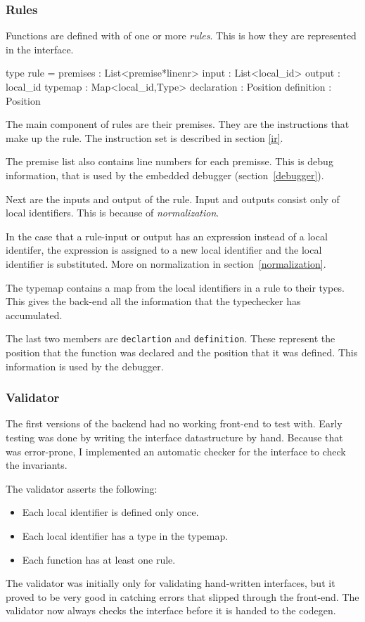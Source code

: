 \subsubsection{Rules}

Functions are defined with of one or more \textit{rules}.
This is how they are represented in the interface.

\begin{code}
type rule = {
  premises    : List<premise*linenr>
  input       : List<local_id>
  output      : local_id
  typemap     : Map<local_id,Type>
  declaration : Position
  definition  : Position
}
\end{code}

The main component of rules are their premises.
They are the instructions that make up the rule.
The instruction set is described in section \ref{ir}.

The premise list also contains line numbers for each premisse.
This is debug information, that is used by the embedded debugger (section~\ref{debugger}).

Next are the inputs and output of the rule.
Input and outputs consist only of local identifiers.
This is because of \textit{normalization}.

In the case that a rule-input or output has an expression instead of a local identifer,
 the expression is assigned to a new local identifier and the local identifier is substituted.
More on normalization in section~\ref{normalization}.

The typemap contains a map from the local identifiers in a rule to their types.
This gives the back-end all the information that the typechecker has accumulated.

The last two members are \verb|declartion| and \verb|definition|.
These represent the position that the function was declared and the position that it was defined.
This information is used by the debugger.

\subsubsection{Validator}
The first versions of the backend had no working front-end to test with.
Early testing was done by writing the interface datastructure by hand.
Because that was error-prone, I implemented an automatic checker for the interface to check the invariants.

The validator asserts the following:
\begin{itemize}
\item Each local identifier is defined only once.
\item Each local identifier has a type in the typemap.
\item Each function has at least one rule.
\end{itemize}

The validator was initially only for validating hand-written interfaces,
but it proved to be very good in catching errors that slipped through the front-end.
The validator now always checks the interface before it is handed to the codegen.

